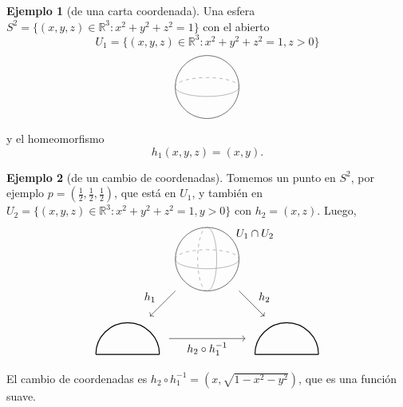 \documentclass[spanish]{book}
\theoremstyle{definition}
\newtheorem*{ejem}{Ejemplo}
\newcommand{\R}{\mathbb{R}}
\begin{document}
\begin{ejem}[de una carta coordenada]
	Una esfera $S^2=\{(x,y,z)\in\R^3:x^2+y^2+z^2=1\}$ con el abierto
	\[U_1=\{(x,y,z)\in\R^3: x^2+y^2+z^2=1, z>0\}\]
	\[\begin{tikzpicture}
		\draw (0,0) circle (1);
		\draw[gray] (-1,0) arc (180:360:1 and 0.3);
		\draw[gray,dashed] (-1,0) arc (180:0:1 and 0.3);
	\end{tikzpicture}\]
	y el homeomorfismo
	\[h_1(x,y,z)=(x,y).\]
\end{ejem}
\begin{ejem}[de un cambio de coordenadas]
	Tomemos un punto en $S^2$, por ejemplo $p=(\frac{1}{2},\frac{1}{2},\frac{1}{2})$, que está en $U_1$, y también en $U_2=\{(x,y,z)\in\R^3: x^2+y^2+z^2=1, y>0\}$ con $h_2=(x,z)$. Luego,
	\[\begin{tikzpicture}
		\draw (0,0) circle (1);
		\draw[gray] (-1,0) arc (180:360:1 and 0.3);
		\draw[gray,dashed] (-1,0) arc (180:0:1 and 0.3);
		\draw[gray,dashed] (0,-1) arc (270:90:0.3 and 1);
		\draw[gray] (0,1) arc (90:-90:0.3 and 1);
		\node at (1.5,0.8) {$U_1\cap U_2$};
		
		\draw[->] (-1,-1) -- (-1.8,-1.8);
		\node at (-1.8,-1.2) {$h_1$};
		\draw[->] (1,-1) -- (1.8,-1.8);
		\node at (1.8,-1.2) {$h_2$};
		\draw[->] (-1.2,-2.5) -- (1.2,-2.5) node[midway,below] {$h_2\circ h_1^{-1}$};
		
		\draw[thick] (-1.5,-3) arc (0:180:1);
		\draw[thick] (-1.5,-3) -- (-3.5,-3);
		
		\draw[thick] (1.5,-3) arc (180:0:1);
		\draw[thick] (1.5,-3) -- (3.5,-3);
	\end{tikzpicture}\]
	El cambio de coordenadas es $h_2\circ h_1^{-1}=(x,\sqrt{1-x^2-y^2})$, que es una función suave.
\end{ejem}
\end{document}
